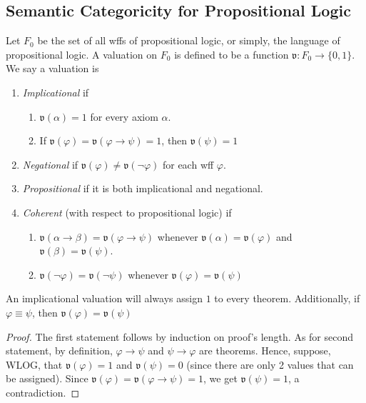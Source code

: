 \documentclass{treatise}
\begin{document}
\begin{shaded}
\section{Semantic Categoricity for Propositional Logic}
Let $F_0$ be the set of all wffs of propositional logic, or simply, the language of propositional logic. A valuation on $F_0$ is defined to be a function $\mathfrak{v}: F_0 \to \{ 0, 1 \}$. We say a valuation is
\begin{enumerate}
    \item \emph{Implicational} if
    \begin{enumerate}
        \item $\mathfrak{v}(\alpha) = 1$ for every axiom $\alpha$.
        \item If $\mathfrak{v}(\varphi) = \mathfrak{v}(\varphi \to \psi) = 1$, then $\mathfrak{v}(\psi) = 1$
    \end{enumerate}
    \item \emph{Negational} if $\mathfrak{v}(\varphi) \neq \mathfrak{v}(\neg \varphi)$ for each wff $\varphi$.
    \item \emph{Propositional} if it is both implicational and negational.
    \item \emph{Coherent} (with respect to propositional logic) if
    \begin{enumerate}
        \item $\mathfrak{v}(\alpha \to \beta) = \mathfrak{v}(\varphi \to \psi)$ whenever $\mathfrak{v}(\alpha) = \mathfrak{v}(\varphi)$ and $\mathfrak{v}(\beta) = \mathfrak{v}(\psi)$.
        \item $\mathfrak{v}(\neg \varphi) = \mathfrak{v}(\neg \psi)$ whenever $\mathfrak{v}(\varphi) = \mathfrak{v}(\psi)$
    \end{enumerate}
\end{enumerate}
\begin{remark}
An implicational valuation will always assign $1$ to every theorem. Additionally, if $\varphi \equiv \psi$, then $\mathfrak{v}(\varphi) = \mathfrak{v}(\psi)$
\end{remark}
\begin{proof}
The first statement follows by induction on proof's length. As for second statement, by definition, $\varphi \to \psi$ and $\psi \to \varphi$ are theorems. Hence, suppose, WLOG, that $\mathfrak{v}(\varphi) = 1$ and $\mathfrak{v}(\psi) = 0$ (since there are only 2 values that can be assigned). Since $\mathfrak{v}(\varphi) = \mathfrak{v}(\varphi \to \psi) = 1$, we get $\mathfrak{v}(\psi) = 1$, a contradiction.

\end{proof}
\end{shaded}
\end{document}
